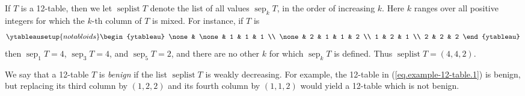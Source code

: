 \documentclass[12pt]{article}
\theoremstyle{plain}
\theoremstyle{definition}
\begin{document}
If $T$ is a 12-table, then we let $\operatorname*{seplist}T$ denote the list
of all values $\operatorname*{sep}\nolimits_{k}T$, in the order of increasing
$k$. Here $k$ ranges over all positive integers for which the $k$-th column
of $T$ is mixed. For instance, if $T$ is
\[
%
\ytableausetup{notabloids}
\begin{ytableau}
\none& \none& 1 & 1 & 1 \\
\none& 2 & 1 & 1 & 2 \\
1 & 2 & 1 \\
2 & 2 & 2
\end{ytableau}%
\]
then $\operatorname*{sep}\nolimits_{1}T=4$, $\operatorname*{sep}\nolimits_{3}T=4$, and
$\operatorname*{sep}\nolimits_{5}T=2$, and there are no other $k$ for which $\operatorname*{sep}\nolimits_{k}T$ is defined. Thus $\operatorname*{seplist}T=\left(  4,4,2\right)  $.

We say that a 12-table $T$ is \textit{benign} if the list
$\operatorname*{seplist}T$ is weakly decreasing. For
example, the 12-table in (\ref{eq.example-12-table.1}) is benign,
but replacing its third column by $\left(1,2,2\right)$ and its
fourth column by $\left(1,1,2\right)$ would yield a 12-table
which is not benign.
\end{document}
